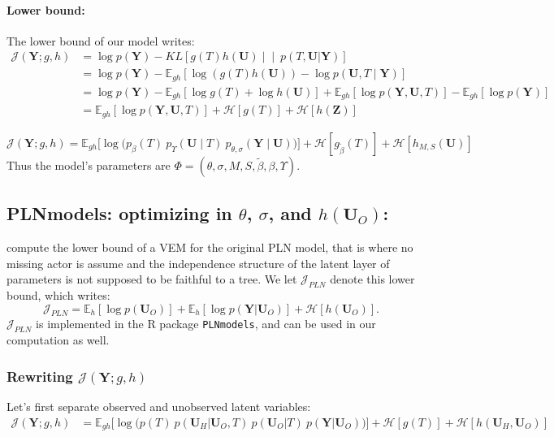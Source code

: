\documentclass[11pt,a4paper]{article}
\newcommand{\entr}{\mathcal{H}}
\newcommand{\Ybf}{\boldsymbol{Y}}
\newcommand{\Zbf}{\boldsymbol{Z}}
\newcommand{\Ubf}{\boldsymbol{U}}
\newcommand{\Esp}{\mathds{E}}
\begin{document}
\paragraph{Lower bound:}
The lower bound of our model writes:
\begin{align*}
\mathcal{J}(\Ybf; g,h)&=\log p(\Ybf) - KL\left[g(T) h(\Ubf) \middle\vert\middle\vert\ p(T,\Ubf | \Ybf)\right]\\
&= \log p(\Ybf) - \Esp_{gh}[\log( g(T) h(\Ubf)) - \log p(\Ubf,T\mid \Ybf) ]\\
&= \log p(\Ybf) - \Esp_{gh}[\log g(T) + \log h(\Ubf) ] + \Esp_{gh}[\log p(\Ybf,\Ubf,T)] - \Esp_{gh}[\log p(\Ybf)]\\
&= \Esp_{gh} [\log p(\Ybf,\Ubf,T)] + \entr[g(T)] + \entr[h(\Zbf)]
\end{align*}

\begin{equation}
\label{firstJ}
 \boxed{\mathcal{J}(\Ybf; g,h) = \Esp_{gh} \Big[\log \big(p_\beta(T)\:p_{\Upsilon}(\Ubf\mid T)\:p_{\theta, \sigma}(\Ybf\mid \Ubf)\big)\Big] + \entr[g_{\widetilde{\beta}}(T)] + \entr[h_{M,S}(\Ubf)]}
\end{equation}
Thus the model's parameters are $\Phi = (\theta,\sigma,M,S,\widetilde{\beta}, \beta,  \Upsilon)$.

\subsection{PLNmodels: optimizing in $\theta$, $\sigma$, and $h(\Ubf_O)$:}
\citet{CMR18} compute the lower bound of a VEM for the original PLN model, that is where no missing actor is assume and the independence structure of the latent layer of parameters is not supposed to be faithful to a tree. We let $\mathcal{J}_{PLN}$ denote this lower bound, which writes:
$$\mathcal{J}_{PLN} = \Esp_h[\log p(\Ubf_O)] + \Esp_h[\log p(\Ybf|\Ubf_O)] + \entr[h(\Ubf_O)].$$ $\mathcal{J}_{PLN}$ is implemented  in the R package \texttt{PLNmodels}, and can be used in our computation as well.

\subsubsection{Rewriting  $\mathcal{J}(\Ybf; g,h)$}
Let's first separate observed and unobserved latent variables:
\begin{align*}
\mathcal{J}(\Ybf; g,h)&= \Esp_{gh}\Big[\log \big(p(T)\:  p(\Ubf_H| \Ubf_O,T)\: p(\Ubf_O|T)\:p(\Ybf|\Ubf_O)\big)\Big] + \entr[g(T)] +\entr[h(\Ubf_H,\Ubf_O)]
\end{align*}
\end{document}
